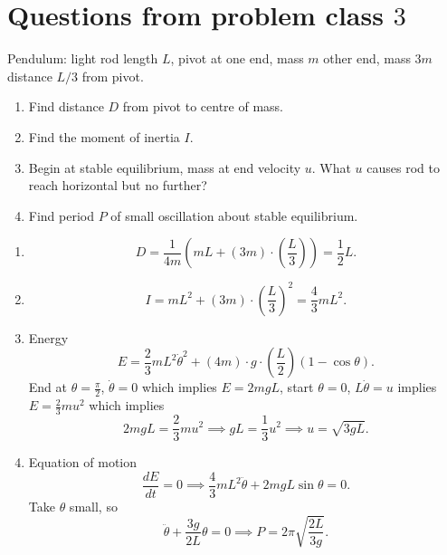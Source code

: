 \documentclass[10pt, a4paper]{article}
\begin{document}
\newpage

\section{Questions from problem class \texorpdfstring{$3$}{}}

\begin{problem}[$2021$ exam]
    Pendulum:
    light rod length $L$,
    pivot at one end,
    mass $m$ other end,
    mass $3m$ distance $L / 3$ from pivot.

    \begin{enumerate}[label = (\roman*)]
        \item Find distance $D$ from pivot to centre of mass.

        \item Find the moment of inertia $I$.

        \item Begin at stable equilibrium,
        mass at end velocity $u$.
        What $u$ causes rod to reach horizontal but no further?

        \item Find period $P$ of small oscillation about stable equilibrium.
    \end{enumerate}

    \begin{solution}
        \begin{enumerate}[label = (\roman*)]
            \item
            \[
            D = \frac{1}{4m}\left(mL + (3m)\cdot\left(\frac{L}{3}\right)\right) = \frac{1}{2}L.
            \]

            \item
            \[
            I = mL ^ 2 + (3m)\cdot\left(\frac{L}{3}\right) ^ 2 = \frac{4}{3}mL ^ 2.
            \]

            \item Energy
            \[
            E = \frac{2}{3}mL ^ 2\dot{\theta} ^ 2 + (4m)\cdot g\cdot\left(\frac{L}{2}\right)(1 - \cos{\theta}).
            \]
            End at $\theta = \frac{\pi}{2}$,
            $\dot{\theta} = 0$ which implies $E = 2mgL$,
            start $\theta = 0$,
            $L\dot{\theta} = u$ implies $E = \frac{2}{3}mu ^ 2$
            which implies
            \[
            2mgL = \frac{2}{3}mu ^ 2 \implies gL = \frac{1}{3}u ^ 2 \implies u = \sqrt{3gL}.
            \]

            \item Equation of motion
            \[
            \frac{dE}{dt} = 0 \implies \frac{4}{3}mL ^ 2\ddot{\theta} + 2mgL\sin{\theta} = 0.
            \]
            Take $\theta$ small,
            so
            \[
            \ddot{\theta} + \frac{3g}{2L}\theta = 0 \implies P = 2\pi\sqrt{\frac{2L}{3g}}.
            \]
        \end{enumerate}
    \end{solution}
\end{problem}
\end{document}
